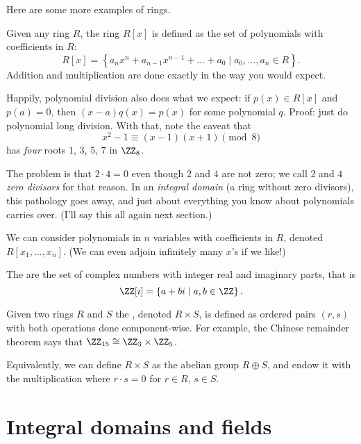 Here are some more examples of rings.
\begin{example}
	Given any ring $R$,
	the ring $R[x]$ is defined as the set of polynomials
	with coefficients in $R$:
	\[ R[x] = \left\{ a_nx^n+a_{n-1}x^{n-1}+\dots+a_0 \mid a_0, \dots, a_n \in R \right\}. \]
	Addition and multiplication are done exactly in the way you would expect.
\end{example}
\begin{remark}
	[Digression] Happily, polynomial division also does what we expect:
	if $p(x) \in R[x]$ and $p(a) = 0$,
	then $(x-a)q(x) = p(x)$ for some polynomial $q$.
	Proof: just do polynomial long division.
	With that, note the caveat that 
	\[ x^2-1 \equiv (x-1)(x+1) \pmod 8 \]
	has \emph{four} roots $1$, $3$, $5$, $7$ in $\Zc8$.

	The problem is that $2 \cdot 4 = 0$ even though $2$ and $4$ are not zero;
	we call $2$ and $4$ \emph{zero divisors} for that reason.
	In an \emph{integral domain} (a ring without zero divisors),
	this pathology goes away,
	and just about everything you know about polynomials carries over.
	(I'll say this all again next section.)
\end{remark}
\begin{example}
	We can consider polynomials in $n$ variables with coefficients in $R$,
	denoted $R[x_1, \dots, x_n]$.
	(We can even adjoin infinitely many $x$'s if we like!)
\end{example}
\begin{example}
	The  are the set of complex numbers
	with integer real and imaginary parts, that is
	\[ \ZZ[i] = \left\{ a+bi \mid a,b \in \ZZ \right\}. \]
\end{example}
\begin{example}
	\label{ex:product_ring}
	Given two rings $R$ and $S$ the ,
	denoted $R \times S$, is defined as ordered pairs $(r,s)$
	with both operations done component-wise.
	For example, the Chinese remainder theorem says
	that $\Zc{15} \cong \Zc3 \times \Zc5$.
\end{example}
\begin{remark}
	Equivalently, we can define $R \times S$ as the abelian group $R \oplus S$,
	and endow it with the multiplication where $r \cdot s = 0$
	for $r \in R$, $s \in S$.
\end{remark}

\section{Integral domains and fields}

